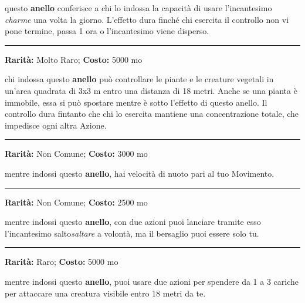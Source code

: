 \begin{multicols}{2}
questo \textbf{anello} conferisce a chi lo indossa la capacità di usare l'incantesimo \emph{charme} una volta la giorno. L'effetto dura finché chi esercita il controllo non vi pone termine, passa 1 ora o l'incantesimo viene disperso.

\smallskip\noindent\rule{\linewidth}{2pt}  \hypertarget{AnellodelControllodellepiante}{}\medskip{}\noindent\label{AnellodelControllodellepiante}

\textbf{Rarità:} Molto Raro; \textbf{Costo:} 5000 mo

chi indossa questo \textbf{anello} può controllare le piante e le creature vegetali in un'area quadrata di 3x3 m entro una distanza di 18 metri. Anche se una pianta è immobile, essa si può spostare mentre è sotto l'effetto di questo anello. Il controllo dura fintanto che chi lo esercita mantiene una concentrazione totale, che impedisce ogni altra Azione.

\smallskip\noindent\rule{\linewidth}{2pt}  \hypertarget{AnellodelNuoto}{}\medskip{}\noindent\label{AnellodelNuoto}

\textbf{Rarità:} Non Comune; \textbf{Costo:} 3000 mo

mentre indossi questo \textbf{anello}, hai velocità di nuoto pari al tuo Movimento.

\smallskip\noindent\rule{\linewidth}{2pt}  \hypertarget{AnellodelSalto}{}\medskip{}\noindent\label{AnellodelSalto}

\textbf{Rarità:} Non Comune; \textbf{Costo:} 2500 mo

mentre indossi questo \textbf{anello}, con due azioni puoi lanciare tramite esso l'incantesimo salto\emph{saltare} a volontà, ma il bersaglio puoi essere solo tu.

\smallskip\noindent\rule{\linewidth}{2pt}  \hypertarget{Anellodell'Ariete}{}\medskip{}\noindent\label{Anellodell'Ariete}

\textbf{Rarità:} Raro; \textbf{Costo:} 5000 mo

mentre indossi questo \textbf{anello}, puoi usare due azioni per spendere da 1 a 3 cariche per attaccare una creatura visibile entro 18 metri da te.


\end{multicols}
